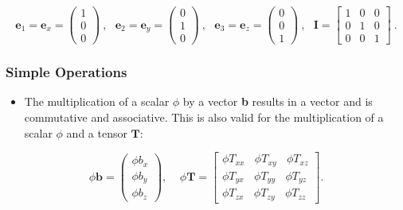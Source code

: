 \documentclass[MathematicsNumericsDerivationsAndOpenFOAM.tex]{subfiles}
\begin{document}
\begin{equation*}
\textbf{e}_1 = \textbf{e}_x = \left( \begin{matrix}   1 \\ 0 \\ 0  \end{matrix}  \right)
~,~~~
\textbf{e}_2= \textbf{e}_y = \left( \begin{matrix}   0 \\ 1 \\ 0  \end{matrix}  \right)
~,~~~
\textbf{e}_3= \textbf{e}_z = \left( \begin{matrix}   0 \\ 0 \\ 1  \end{matrix}  \right)
~,~~~
\textbf{I} = \left[ \begin{matrix}   1 & 0 & 0 \\ 0 & 1 & 0 \\ 0 & 0 & 1  \end{matrix}  \right] ~.
\end{equation*}
%
%
%
\subsubsection{Simple Operations}
%
%
\begin{itemize}
    \item The multiplication of a scalar $\phi$ by a vector \textbf{b} results
    in a vector and is commutative and associative. This is also valid for
    the multiplication of a scalar $\phi$ and a tensor $\textbf{T}$:
\end{itemize}
%
%
\begin{equation}
  \phi \textbf{b} =
  \left(
  \begin{matrix}
    \phi b_x \\ \phi b_y \\ \phi b_z
  \end{matrix}
  \right)
  ,~~~~~
  \phi\textbf{T}
=
  \left[
  \begin{matrix}
   \phi T_{xx} ~ ~ ~ ~ \phi T_{xy} ~ ~ ~ ~ \phi T_{xz} \\
   \phi T_{yx} ~ ~ ~ ~ \phi T_{yy} ~ ~ ~ ~ \phi T_{yz} \\
   \phi T_{zx} ~ ~ ~ ~ \phi T_{zy} ~ ~ ~ ~ \phi T_{zz}
  \end{matrix}
  \right].
\label{EQUATION::simple}
\end{equation}
%
%
%
%
\end{document}
